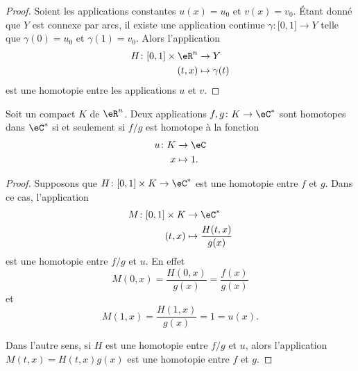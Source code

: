 \begin{proof}
    Soient les applications constantes \( u(x)=u_0\) et \( v(x)=v_0\). Étant donné que \( Y\) est connexe par arcs, il existe une application continue \( \gamma\colon \mathopen[ 0 , 1 \mathclose]\to Y\) telle que \( \gamma(0)=u_0\) et \( \gamma(1)=v_0\). Alors l'application
    \begin{equation}
        \begin{aligned}
            H\colon \mathopen[ 0 , 1 \mathclose]\times \eR^n&\to Y \\
            (t,x)&\mapsto \gamma(t) 
        \end{aligned}
    \end{equation}
    est une homotopie entre les applications \( u\) et \( v\).
\end{proof}

\begin{proposition}
    Soit un compact \( K\) de \( \eR^n\). Deux applications \( f,g\colon K\to \eC^*\) sont homotopes dans \( \eC^*\) si et seulement si \( f/g\) est homotope à la fonction 
    \begin{equation}
        \begin{aligned}
            u\colon K&\to \eC \\
            x&\mapsto 1. 
        \end{aligned}
    \end{equation}
\end{proposition}

\begin{proof}
    Supposons que \( H\colon \mathopen[ 0 , 1 \mathclose]\times K\to \eC^*\) est une homotopie entre \( f\) et \( g\). Dans ce cas, l'application
    \begin{equation}
        \begin{aligned}
            M\colon \mathopen[ 0 , 1 \mathclose]\times K&\to \eC^* \\
            (t,x)&\mapsto \frac{ H(t,x) }{ g(x) } 
        \end{aligned}
    \end{equation}
    est une homotopie entre \( f/g\) et \( u\). En effet
    \begin{equation}
        M(0,x)=\frac{ H(0,x) }{ g(x) }=\frac{ f(x) }{ g(x) }
    \end{equation}
    et
    \begin{equation}
        M(1,x)=\frac{ H(1,x) }{ g(x) }=1=u(x).
    \end{equation}

    Dans l'autre sens, si \( H\) est une homotopie entre \( f/g\) et \( u\), alors l'application \( M(t,x)=H(t,x)g(x)\) est une homotopie entre \( f\) et \( g\).
\end{proof}


